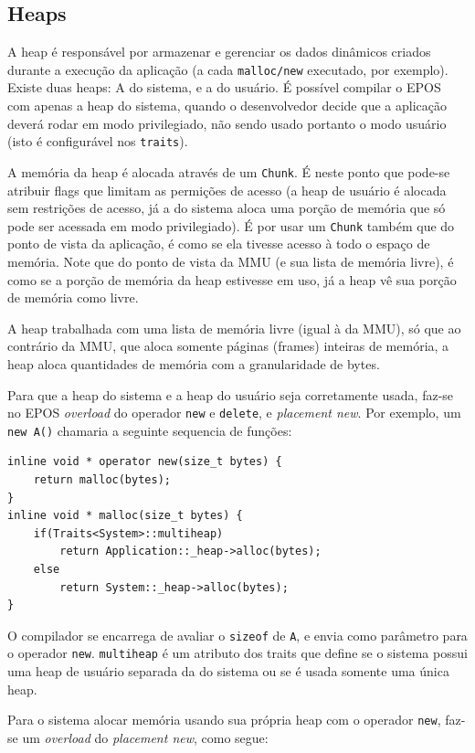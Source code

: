\subsection{Heaps}

A heap é responsável por armazenar e gerenciar os dados dinâmicos criados durante a execução da aplicação (a cada \verb+malloc/new+ executado, por exemplo). Existe duas heaps: A do sistema, e a do usuário. É possível compilar o EPOS com apenas a heap do sistema, quando o desenvolvedor decide que a aplicação deverá rodar em modo privilegiado, não sendo usado portanto o modo usuário (isto é configurável nos \verb+traits+).

A memória da heap é alocada através de um \verb+Chunk+. É neste ponto que pode-se atribuir flags que limitam as permições de acesso (a heap de usuário é alocada sem restrições de acesso, já a do sistema aloca uma porção de memória que só pode ser acessada em modo privilegiado). É por usar um \verb+Chunk+ também que do ponto de vista da aplicação, é como se ela tivesse acesso à todo o espaço de memória. Note que do ponto de vista da MMU (e sua lista de memória livre), é como se a porção de memória da heap estivesse em uso, já a heap vê sua porção de memória como livre.

A heap trabalhada com uma lista de memória livre (igual à da MMU), só que ao contrário da MMU, que aloca somente páginas (frames) inteiras de memória, a heap aloca quantidades de memória com a granularidade de bytes.

Para que a heap do sistema e a heap do usuário seja corretamente usada, faz-se no EPOS \emph{overload} do operador \verb+new+ e \verb+delete+, e \emph{placement new}. Por exemplo, um \verb+new A()+ chamaria a seguinte sequencia de funções:

\begin{lstlisting}
inline void * operator new(size_t bytes) {
    return malloc(bytes);
}
inline void * malloc(size_t bytes) {
    if(Traits<System>::multiheap)
        return Application::_heap->alloc(bytes);
    else
        return System::_heap->alloc(bytes);
}
\end{lstlisting}

O compilador se encarrega de avaliar o \verb+sizeof+ de \verb+A+, e envia como parâmetro para o operador \verb+new+. \verb+multiheap+ é um atributo dos traits que define se o sistema possui uma heap de usuário separada da do sistema ou se é usada somente uma única heap.

Para o sistema alocar memória usando sua própria heap com o operador \verb+new+, faz-se um \emph{overload} do \emph{placement new}, como segue:

